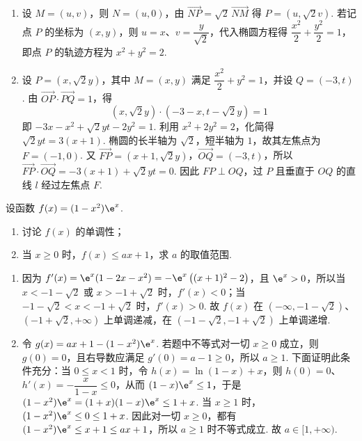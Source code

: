 \begin{solution}
\begin{enumerate}
\item 设 \(M=(u,v)\)，则 \(N=(u,0)\)，由 \(\overrightarrow{NP}=\sqrt2\,\overrightarrow{NM}\) 得 \(P=(u,\sqrt2v)\). 若记点 \(P\) 的坐标为 \((x,y)\)，则 \(u=x\)、\(v=\dfrac{y}{\sqrt2}\)，代入椭圆方程得 \(\dfrac{x^2}{2}+\dfrac{y^2}{2}=1\)，即点 \(P\) 的轨迹方程为 \(x^2+y^2=2\).
\item 设 \(P=(x,\sqrt2y)\)，其中 \(M=(x,y)\) 满足 \(\dfrac{x^2}{2}+y^2=1\)，并设 \(Q=(-3,t)\). 由 \(\overrightarrow{OP}\cdot\overrightarrow{PQ}=1\)，得
\[
(x,\sqrt2y)\cdot(-3-x,t-\sqrt2y)=1
\]
即 \(-3x-x^2+\sqrt2yt-2y^2=1\). 利用 \(x^2+2y^2=2\)，化简得 \(\sqrt2yt=3(x+1)\). 椭圆的长半轴为 \(\sqrt2\)，短半轴为 \(1\)，故其左焦点为 \(F=(-1,0)\). 又 \(\overrightarrow{FP}=(x+1,\sqrt2y)\)，\(\overrightarrow{OQ}=(-3,t)\)，所以 \(\overrightarrow{FP}\cdot\overrightarrow{OQ}=-3(x+1)+\sqrt2yt=0\). 因此 \(FP\perp OQ\)，过 \(P\) 且垂直于 \(OQ\) 的直线 \(l\) 经过左焦点 \(F\).
\end{enumerate}
\end{solution}

\begin{problem}
设函数 \(f(x)=(1-x^2)\e^x\).
\begin{enumerate}
\item 讨论 \(f(x)\) 的单调性；
\item 当 \(x\ge0\) 时，\(f(x)\le ax+1\)，求 \(a\) 的取值范围.
\end{enumerate}
\end{problem}

\begin{solution}
\begin{enumerate}
\item 因为 \(f'(x)=\e^x(1-2x-x^2)=-\e^x\left((x+1)^2-2\right)\)，且 \(\e^x>0\)，所以当 \(x<-1-\sqrt2\) 或 \(x>-1+\sqrt2\) 时，\(f'(x)<0\)；当 \(-1-\sqrt2<x<-1+\sqrt2\) 时，\(f'(x)>0\). 故 \(f(x)\) 在 \((-\infty,-1-\sqrt2)\)、\((-1+\sqrt2,+\infty)\) 上单调递减，在 \((-1-\sqrt2,-1+\sqrt2)\) 上单调递增.
\item 令 \(g(x)=ax+1-(1-x^2)\e^x\). 若题中不等式对一切 \(x\ge0\) 成立，则 \(g(0)=0\)，且右导数应满足 \(g'(0)=a-1\ge0\)，所以 \(a\ge1\). 下面证明此条件充分：当 \(0\le x<1\) 时，令 \(h(x)=\ln(1-x)+x\)，则 \(h(0)=0\)、\(h'(x)=-\dfrac{x}{1-x}\le0\)，从而 \((1-x)\e^x\le1\)，于是 \((1-x^2)\e^x=(1+x)(1-x)\e^x\le1+x\). 当 \(x\ge1\) 时，\((1-x^2)\e^x\le0\le1+x\). 因此对一切 \(x\ge0\)，都有 \((1-x^2)\e^x\le x+1\le ax+1\)，所以 \(a\ge1\) 时不等式成立. 故 \(a\in[1,+\infty)\).
\end{enumerate}
\end{solution}

